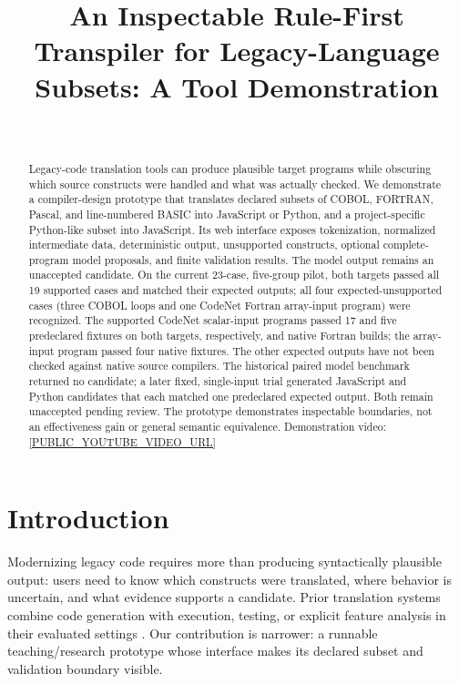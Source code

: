 \documentclass[10pt,conference]{IEEEtran}
\title{An Inspectable Rule-First Transpiler for Legacy-Language Subsets: A Tool Demonstration}
\author{\IEEEauthorblockN{[Author Name]}\\
\IEEEauthorblockA{[Department and Institution]\\
[City, Country]\\
[Contact Email]}}
\begin{document}
\maketitle

\begin{abstract}
Legacy-code translation tools can produce plausible target programs while obscuring
which source constructs were handled and what was actually checked. We demonstrate a
compiler-design prototype that translates declared subsets of COBOL, FORTRAN, Pascal,
and line-numbered BASIC into JavaScript or Python, and a project-specific Python-like
subset into JavaScript. Its web interface exposes tokenization, normalized intermediate
data, deterministic output, unsupported constructs, optional complete-program model
proposals, and finite validation results. The model output remains an unaccepted
candidate. On the current 23-case, five-group pilot, both targets passed all 19
supported cases and matched their expected outputs; all four expected-unsupported
cases (three COBOL loops and one CodeNet Fortran array-input program) were recognized.
The supported CodeNet scalar-input programs passed 17 and five predeclared fixtures on
both targets, respectively, and native Fortran builds; the array-input program passed four native fixtures. The other
expected outputs have not been checked against native source compilers. The historical
paired model benchmark returned no candidate;
a later fixed, single-input trial generated JavaScript and Python candidates that each
matched one predeclared expected output. Both remain unaccepted pending review. The
prototype demonstrates inspectable boundaries, not an effectiveness gain or general
semantic equivalence.
Demonstration video: \url{[PUBLIC_YOUTUBE_VIDEO_URL]}
\end{abstract}

\section{Introduction}
Modernizing legacy code requires more than producing syntactically plausible output:
users need to know which constructs were translated, where behavior is uncertain, and
what evidence supports a candidate. Prior translation systems combine code generation
with execution, testing, or explicit feature analysis in their evaluated settings
\cite{yang2024,zhang2025}. Our contribution is narrower: a runnable teaching/research
prototype whose interface makes its declared subset and validation boundary visible.
\end{document}

